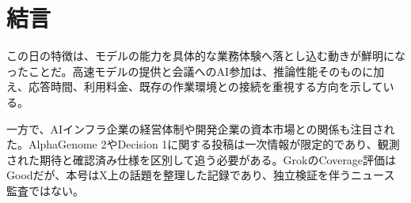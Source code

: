 \section{結言}
この日の特徴は、モデルの能力を具体的な業務体験へ落とし込む動きが鮮明になったことだ。高速モデルの提供と会議へのAI参加は、推論性能そのものに加え、応答時間、利用料金、既存の作業環境との接続を重視する方向を示している。

一方で、AIインフラ企業の経営体制や開発企業の資本市場との関係も注目された。AlphaGenome 2やDecision 1に関する投稿は一次情報が限定的であり、観測された期待と確認済み仕様を区別して追う必要がある。GrokのCoverage評価はGoodだが、本号はX上の話題を整理した記録であり、独立検証を伴うニュース監査ではない。